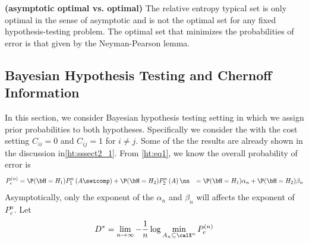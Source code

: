 \documentclass{article}
\newcommand{\bfs}[1]{\textbf{({#1})}}
\begin{document}
\begin{rema}{\bfs{asymptotic optimal vs. optimal}}
The relative entropy typical set is only optimal in the sense of asymptotic and is not the optimal set for any fixed hypothesis-testing problem. The optimal set that minimizes the probabilities of error is that given by the Neyman-Pearson lemma.
\end{rema}


\subsection{Bayesian Hypothesis Testing and Chernoff Information}\label{ht:ssec4}

In this section, we consider Bayesian hypothesis testing setting in which we assign prior probabilities to both hypotheses. Specifically we consider the  with the cost setting $C_{ii}= 0$ and $C_{ij}= 1$ for $i\ne j$. Some of the the results are already shown in the discussion in\cref{ht:sssect2_1}. From \cref{ht:eq1}, we know the overall probability of error is
    \begin{align}
        P_{e}^{(n)} &=  \P(\bH = H_1)P_{1}^{n}\left(A\setcomp\right) + \P(\bH = H_2)P_{2}^{n}\left(A\right)\nn
         &= \P(\bH = H_1)\alpha_n + \P(\bH = H_2)\beta_n
    \end{align}
Asymptotically, only the exponent of the $\alpha_n$ and $\beta_n$ will affects the exponent of $P_{e}^n$. Let 
\begin{align*}
D^{*}=\lim _{n \rightarrow \infty}-\frac{1}{n} \log \min _{A_{n} \subseteq \calX ^{n}} P_{e}^{(n)}
\end{align*}
\end{document}
